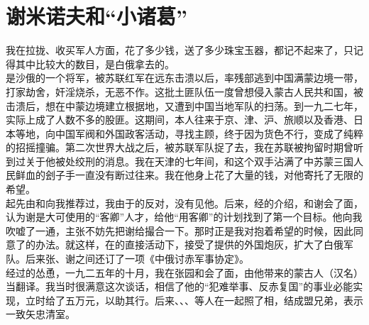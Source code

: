\fancyhead[RO]{\thepage} %
\fancyhead[LE]{\thepage} %
\chapter*{谢米诺夫和“小诸葛”}
我在拉拢、收买军人方面，花了多少钱，送了多少珠宝玉器，都记不起来了，只记得其中比较大的数目，是白俄拿去的。\\

是沙俄的一个将军，被苏联红军在远东击溃以后，率残部逃到中国满蒙边境一带，打家劫舍，奸淫烧杀，无恶不作。这批土匪队伍一度曾想侵入蒙古人民共和国，被击溃后，想在中蒙边境建立根据地，又遭到中国当地军队的扫荡。到一九二七年，实际上成了人数不多的股匪。这期间，本人往来于京、津、沪、旅顺以及香港、日本等地，向中国军阀和外国政客活动，寻找主顾，终于因为货色不行，变成了纯粹的招摇撞骗。第二次世界大战之后，被苏联军队捉了去，我在苏联被拘留时期曾听到过关于他被处绞刑的消息。我在天津的七年间，和这个双手沾满了中苏蒙三国人民鲜血的刽子手一直没有断过往来。我在他身上花了大量的钱，对他寄托了无限的希望。\\

起先由和向我推荐过，我由于的反对，没有见他。后来，经的介绍，和谢会了面，认为谢是大可使用的“客卿”人才，给他“用客卿”的计划找到了第一个目标。他向我吹嘘了一通，主张不妨先把谢给撮合一下。那时正是我对抱着希望的时候，因此同意了的办法。就这样，在的直接活动下，接受了提供的外国炮灰，扩大了白俄军队。后来张、谢之间还订了一项《中俄讨赤军事协定》。\\

经过的怂恿，一九二五年的十月，我在张园和会了面，由他带来的蒙古人（汉名）当翻译。我当时很满意这次谈话，相信了他的“犯难举事、反赤复国”的事业必能实现，立时给了五万元，以助其行。后来、、、等人在一起照了相，结成盟兄弟，表示一致矢忠清室。\\


